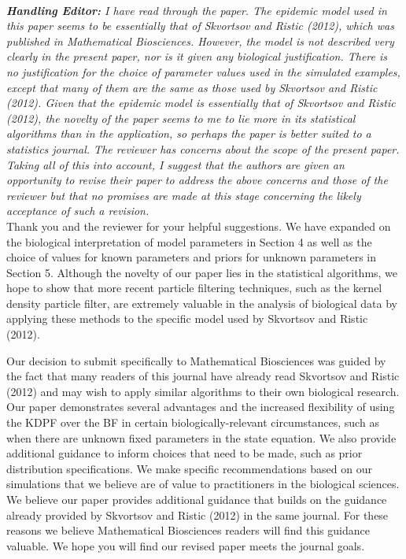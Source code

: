 \documentclass{article}
\begin{document}
 \\

\noindent \emph{{\bf Handling Editor:}  I have read through the paper.  The epidemic model used in this paper seems to be essentially that of Skvortsov and Ristic (2012), which was published in Mathematical Biosciences.  However, the model is not described very clearly in the present paper, nor is it given any biological justification.  There is no justification for the choice of parameter values used in the simulated examples, except that many of them are the same as those used by Skvortsov and Ristic (2012).  Given that the epidemic model is essentially that of Skvortsov and Ristic (2012), the novelty of the paper seems to me to lie more in its statistical algorithms than in the application, so perhaps the paper is better suited to a statistics journal.  The reviewer has concerns about the scope of the present paper.  Taking all of this into account, I suggest that the authors are given an opportunity to revise their paper to address the above concerns and those of the reviewer but that no promises are made at this stage concerning the likely acceptance of such a revision.} \\

Thank you and the reviewer for your helpful suggestions. We have expanded on the biological interpretation of model parameters in Section 4 as well as the choice of values for known parameters and priors for unknown parameters in Section 5. Although the novelty of our paper lies in the statistical algorithms, we hope to show that more recent particle filtering techniques, such as the kernel density particle filter, are extremely valuable in the analysis of biological data by applying these methods to the specific model used by Skvortsov and Ristic (2012).

Our decision to submit specifically to Mathematical Biosciences was guided by the fact that many readers of this journal have already read Skvortsov and Ristic (2012) and may wish to apply similar algorithms to their own biological research. Our paper demonstrates several advantages and the increased flexibility of using the KDPF over the BF in certain biologically-relevant circumstances, such as when there are unknown fixed parameters in the state equation. We also provide additional guidance to inform choices that need to be made, such as prior distribution specifications. We make specific recommendations based on our simulations that we believe are of value to practitioners in the biological sciences. We believe our paper provides additional guidance that builds on the guidance already provided by Skvortsov and Ristic (2012) in the same journal. For these reasons we believe Mathematical Biosciences readers will find this guidance valuable. We hope you will find our revised paper meets the journal goals. \\
\end{document}
